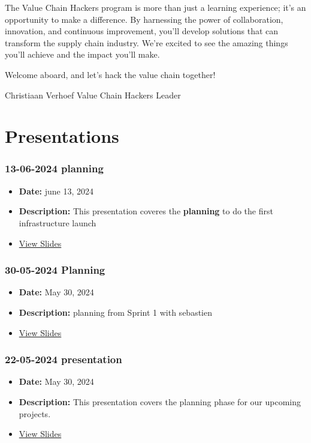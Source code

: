 \documentclass[
  letterpaper,
  DIV=11,
  numbers=noendperiod]{scrreprt}
\providecommand{\tightlist}{%
  \setlength{\itemsep}{0pt}\setlength{\parskip}{0pt}}\usepackage{longtable,booktabs,array}
\begin{document}
The Value Chain Hackers program is more than just a learning experience;
it's an opportunity to make a difference. By harnessing the power of
collaboration, innovation, and continuous improvement, you'll develop
solutions that can transform the supply chain industry. We're excited to
see the amazing things you'll achieve and the impact you'll make.

Welcome aboard, and let's hack the value chain together!

Christiaan Verhoef Value Chain Hackers Leader


\chapter{Presentations}\label{presentations}

\subsection{13-06-2024 planning}\label{planning}

\begin{itemize}
\tightlist
\item
  \textbf{Date:} june 13, 2024
\item
  \textbf{Description:} This presentation coveres the \textbf{planning}
  to do the first infrastructure launch
\item
  \href{./13-05-2024\%20planning.qmd}{View Slides}
\end{itemize}

\subsection{30-05-2024 Planning}\label{planning-1}

\begin{itemize}
\tightlist
\item
  \textbf{Date:} May 30, 2024
\item
  \textbf{Description:} planning from Sprint 1 with sebastien
\item
  \href{./30-05-2024\%20Planning.html}{View Slides}
\end{itemize}

\subsection{22-05-2024 presentation}\label{presentation}

\begin{itemize}
\tightlist
\item
  \textbf{Date:} May 30, 2024
\item
  \textbf{Description:} This presentation covers the planning phase for
  our upcoming projects.
\item
  \href{./22-05-2024\%20presentation2.qmd}{View Slides}
\end{itemize}
\end{document}

